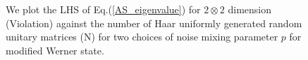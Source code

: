 \begin{figure}[htp]
\centering
{}
\caption{\footnotesize{We plot the LHS of Eq.(\ref{AS_eigenvalue}) for $2\otimes2$ dimension (Violation) against the number of  Haar uniformly generated random unitary matrices (N) for two choices of noise mixing parameter $p$ for modified Werner state.}}
\label{RandomU_modW}
\end{figure}

